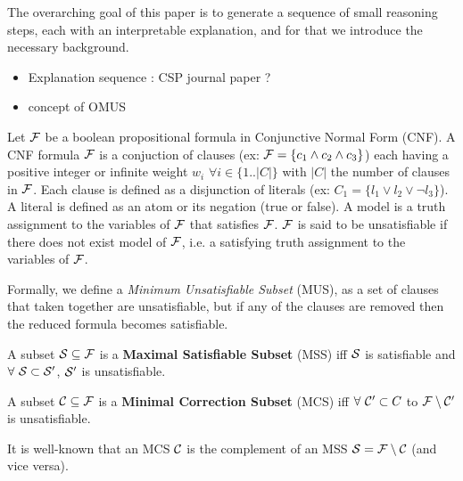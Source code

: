 The overarching goal of this paper is to generate a sequence of small reasoning steps, each with an interpretable explanation, and for that we introduce the necessary background.
\begin{itemize}
    \item Explanation sequence : CSP journal paper ?
    \item concept of OMUS
\end{itemize}


Let $\mathcal{F}$ be a boolean propositional formula in Conjunctive Normal Form (CNF). A CNF formula $\mathcal{F}$ is a  conjuction of clauses  (ex: $\mathcal{F} = \{ c_1 \wedge c_2  \wedge c_3 \} $) each having a positive integer or infinite weight $w_i$ $\forall i \in \{1.. |C| \}$ with $|C|$ the number of clauses in $\mathcal{F}$.
Each clause is defined as a disjunction of literals (ex: $C_1 = \{ l_1 \vee l_2 \vee \lnot l_3 \}$).
A literal is defined as an atom or its negation (true or false).
A model is a truth assignment to the variables of $\mathcal{F}$ that satisfies $\mathcal{F}$.
$\mathcal{F}$ is said to be unsatisfiable if there does not exist model of $\mathcal{F}$, i.e. a satisfying truth assignment to the variables of $\mathcal{F}$.

Formally, we define a \textit{Minimum Unsatisfiable Subset} (MUS), as a set of clauses that taken together are unsatisfiable, but if any of the clauses are removed then the reduced formula becomes satisfiable.

\begin{definition}
    A subset $\mathcal{S} \subseteq \mathcal{F}$ is a \textbf{Maximal Satisfiable Subset} (MSS) iff $ \mathcal{S}$ is satisfiable and $\forall \ \mathcal{S}  \subset  \mathcal{S}' $, $\mathcal{S}'$ is unsatisfiable.
\end{definition}

\begin{definition}
    A subset $\mathcal{C} \subseteq \mathcal{F}$ is a \textbf{Minimal Correction Subset} (MCS) iff $ \forall \ \mathcal{C}' \subset C$ to $\mathcal{F} \setminus \mathcal{C}'$ is unsatisfiable.
\end{definition}

\noindent It is well-known that an MCS $\mathcal{C}$ is the complement of an MSS $\mathcal{S} = \mathcal{F} \setminus \mathcal{C}$ (and vice versa).


